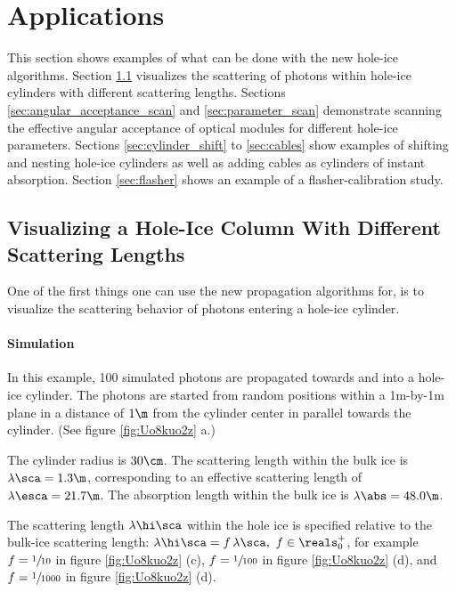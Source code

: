 
\section{Applications}
\label{sec:applications}

This section shows examples of what can be done with the new hole-ice algorithms. Section \ref{sec:scattering_simulation} visualizes the scattering of photons within hole-ice cylinders with different scattering lengths. Sections \ref{sec:angular_acceptance_scan} and \ref{sec:parameter_scan} demonstrate scanning the effective angular acceptance of optical modules for different hole-ice parameters. Sections \ref{sec:cylinder_shift} to \ref{sec:cables} show examples of shifting and nesting hole-ice cylinders as well as adding cables as cylinders of instant absorption. Section \ref{sec:flasher} shows an example of a flasher-calibration study.


\subsection{Visualizing a Hole-Ice Column With Different Scattering Lengths}
\label{sec:scattering_simulation}

One of the first things one can use the new propagation algorithms for, is to visualize the scattering behavior of photons entering a hole-ice cylinder.

\paragraph{Simulation}
In this example, 100 simulated photons are propagated towards and into a hole-ice cylinder. The photons are started from random positions within a 1m-by-1m plane in a distance of $1\m$ from the cylinder center in parallel towards the cylinder. (See figure \ref{fig:Uo8kuo2z} a.)

The cylinder radius is $30\cm$. The scattering length within the bulk ice is $\lambda\sca = 1.3\m$, corresponding to an effective scattering length of $\lambda\esca = 21.7\m$. The absorption length within the bulk ice is $\lambda\abs = 48.0\m$.

The scattering length $\lambda\hi\sca$ within the hole ice is specified relative to the bulk-ice scattering length: $\lambda\hi\sca = f\,\lambda\sca, \ f \in \reals_0^+$, for example $f = \sfrac{1}{10}$ in figure \ref{fig:Uo8kuo2z} (c), $f = \sfrac{1}{100}$ in figure \ref{fig:Uo8kuo2z} (d), and $f = \sfrac{1}{1000}$ in figure \ref{fig:Uo8kuo2z} (d).


